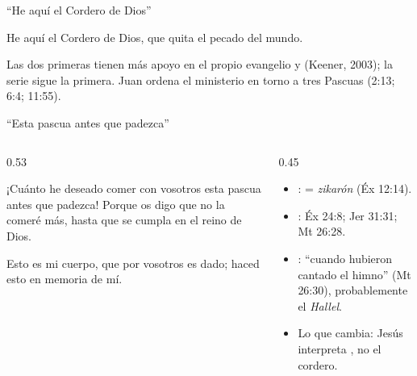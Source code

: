 \begin{frame}{``He aquí el Cordero de Dios''}
\begin{cita}He aquí el Cordero de Dios, que quita el pecado del mundo.\end{cita}
\centering
{}\par\medskip
\small\RaggedRight Las dos primeras tienen más apoyo en el propio evangelio y  (Keener, 2003); la serie sigue la primera. Juan ordena el ministerio en torno a tres Pascuas (2:13; 6:4; 11:55).
\end{frame}

\begin{frame}{``Esta pascua antes que padezca''}
\begin{columns}[c,onlytextwidth]
\begin{column}{0.53\textwidth}
\begin{cita}¡Cuánto he deseado comer con vosotros esta pascua antes que padezca! Porque os digo que no la comeré más, hasta que se cumpla en el reino de Dios.\end{cita}
\begin{cita}Esto es mi cuerpo, que por vosotros es dado; haced esto en memoria de mí.\end{cita}
\end{column}
\begin{column}{0.45\textwidth}\small
\begin{itemize}
\item {}:  = \emph{zikarón} (Éx 12:14).
\item {}: Éx 24:8; Jer 31:31; Mt 26:28.
\item {}: ``cuando hubieron cantado el himno'' (Mt 26:30), probablemente el \emph{Hallel}.
\item Lo que cambia: Jesús interpreta , no el cordero.
\end{itemize}
\end{column}
\end{columns}
\end{frame}

